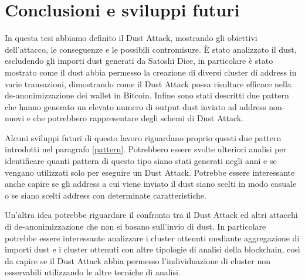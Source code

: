 \chapter{Conclusioni e sviluppi futuri}
In questa tesi abbiamo definito il Dust Attack, mostrando gli obiettivi dell'attacco, le conseguenze e le possibili contromisure. È stato analizzato il dust, escludendo gli importi dust generati da Satoshi Dice, in particolare è stato mostrato come il dust abbia permesso la creazione di diversi cluster di address in varie transazioni, dimostrando come il Dust Attack possa risultare efficace nella de-anonimizzazione dei wallet in Bitcoin. Infine sono stati descritti due pattern che hanno generato un elevato numero di output dust inviato ad address non-nuovi e che potrebbero rappresentare degli schemi di Dust Attack. 

Alcuni sviluppi futuri di questo lavoro riguardano proprio questi due pattern introdotti nel paragrafo \ref{pattern}. Potrebbero essere svolte ulteriori analisi per identificare quanti pattern di questo tipo siano stati generati negli anni e se vengano utilizzati solo per eseguire un Dust Attack. Potrebbe essere interessante anche capire se gli address a cui viene inviato il dust siano scelti in modo casuale o se siano scelti address con determinate caratteristiche. 

Un'altra idea potrebbe riguardare il confronto tra il Dust Attack ed altri attacchi di de-anonimizzazione che non si basano sull'invio di dust. In particolare potrebbe essere interessante analizzare i cluster ottenuti mediante aggregazione di importi dust e i cluster ottenuti con altre tipologie di analisi della blockchain, così da capire se il Dust Attack abbia permesso l'individuazione di cluster non osservabili utilizzando le altre tecniche di analisi.
